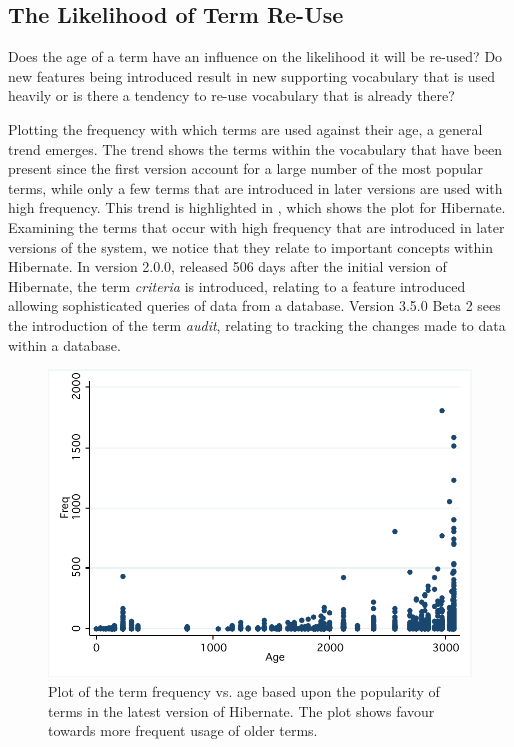 
\subsection{The Likelihood of Term Re-Use} %
\label{sub:the_likelihood_of_term_re_use}

Does the age of a term have an influence on the likelihood it will be re-used? Do new features being introduced result in new supporting vocabulary that is used heavily or is there a tendency to re-use vocabulary that is already there?

Plotting the frequency with which terms are used against their age, a general trend emerges. The trend shows the terms within the vocabulary that have been present since the first version account for a large number of the most popular terms, while only a few terms that are introduced in later versions are used with high frequency. This trend is highlighted in , which shows the plot for Hibernate. Examining the terms that occur with high frequency that are introduced in later versions of the system, we notice that they relate to important concepts within Hibernate. In version 2.0.0, released 506 days after the initial version of Hibernate, the term \emph{criteria} is introduced, relating to a feature introduced allowing sophisticated queries of data from a database. Version 3.5.0 Beta 2 sees the introduction of the term \emph{audit}, relating to tracking the changes made to data within a database.

\begin{figure}[t]
\centering
\includegraphics[width=\textwidth]{Figures/Vocab-HibernateFrequencyAge.pdf}
\caption{Plot of the term frequency vs. age based upon the popularity of terms in the latest version of Hibernate. The plot shows favour towards more frequent usage of older terms.}
\label{fig:vocab-freqage-hibernate}
\end{figure}

